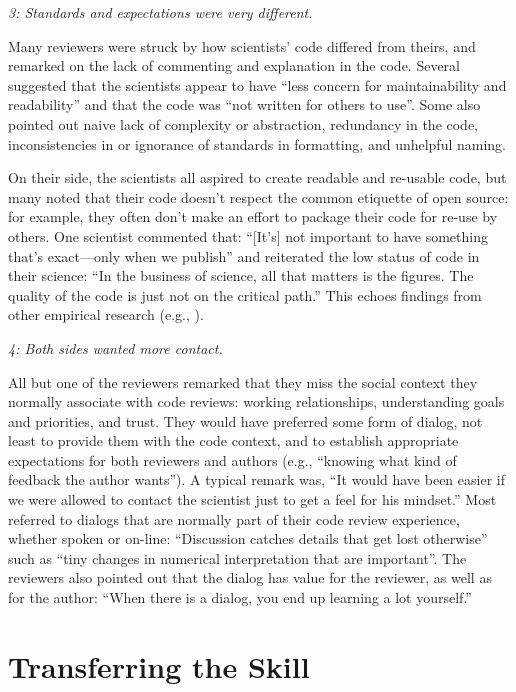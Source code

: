 \documentclass[10pt,twocolumn]{article}
\begin{document}
\noindent \emph{3: Standards and expectations were very different.}

Many reviewers were struck by how scientists' code differed from theirs,
and remarked on the lack of commenting and explanation in the code.
Several suggested that the scientists appear to have ``less concern for maintainability and readability''
and that the code was ``not written for others to use''.
Some also pointed out naive lack of complexity or abstraction,
redundancy in the code,
inconsistencies in or ignorance of standards in formatting,
and unhelpful naming.

On their side,
the scientists all aspired to create readable and re-usable code,
but many noted that their code doesn't respect the common etiquette of open source:
for example,
they often don't make an effort to package their code for re-use by others.
One scientist commented that:
``[It's] not important to have something that's exact---only when we publish''
and reiterated the low status of code in their science:
``In the business of science, all that matters is the figures. The quality of the code is just not on the critical path.''
This echoes findings from other empirical research (e.g., \cite{b:segal2005,b:segal2007}).

\noindent \emph{4: Both sides wanted more contact.}

All but one of the reviewers remarked that they miss the social context they normally associate with code reviews:
working relationships, understanding goals and priorities, and trust.
They would have preferred some form of dialog,
not least to provide them with the code context,
and to establish appropriate expectations for both reviewers and authors
(e.g., ``knowing what kind of feedback the author wants'').
A typical remark was,
``It would have been easier if we were allowed to contact the scientist just to get a feel for his mindset.''
Most referred to dialogs that are normally part of their code review experience,
whether spoken or on-line:
``Discussion catches details that get lost otherwise''
such as ``tiny changes in numerical interpretation that are important''.
The reviewers also pointed out that the dialog has value for the reviewer,
as well as for the author:
``When there is a dialog, you end up learning a lot yourself.''

\section{Transferring the Skill}
\end{document}
